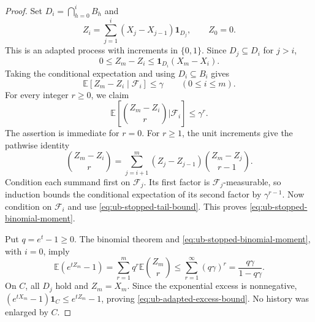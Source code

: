 \documentclass[11pt]{article}
\numberwithin{equation}{section}
\newcommand{\E}{\mathbb E}
\newcommand{\1}{\mathbf 1}
\begin{document}
\begin{proof}
Set $D_i=\bigcap_{h=0}^iB_h$ and
\[
 Z_i=\sum_{j=1}^i(X_j-X_{j-1})\1_{D_j},\qquad Z_0=0.
\]
This is an adapted process with increments in $\{0,1\}$. Since
$D_j\subseteq D_i$ for $j>i$,
\[
 0\le Z_m-Z_i\le\1_{D_i}(X_m-X_i).
\]
Taking the conditional expectation and using $D_i\subseteq B_i$ gives
\begin{equation}
\label{eq:ub-stopped-tail-bound}
 \E[Z_m-Z_i\mid\mathcal F_i]\le\gamma
 \qquad(0\le i\le m).
\end{equation}
For every integer $r\ge0$, we claim
\begin{equation}
\label{eq:ub-stopped-binomial-moment}
 \E\left[\binom{Z_m-Z_i}{r}\mathrel{\Big|}\mathcal F_i\right]
 \le\gamma^r.
\end{equation}
The assertion is immediate for $r=0$. For $r\ge1$, the unit increments
give the pathwise identity
\[
 \binom{Z_m-Z_i}{r}
 =\sum_{j=i+1}^m(Z_j-Z_{j-1})\binom{Z_m-Z_j}{r-1}.
\]
Condition each summand first on $\mathcal F_j$. Its first factor is
$\mathcal F_j$-measurable, so induction bounds the conditional
expectation of its second factor by $\gamma^{r-1}$. Now condition on
$\mathcal F_i$ and use \eqref{eq:ub-stopped-tail-bound}. This proves
\eqref{eq:ub-stopped-binomial-moment}.

Put $q=e^t-1\ge0$. The binomial theorem and
\eqref{eq:ub-stopped-binomial-moment}, with $i=0$, imply
\[
 \E(e^{tZ_m}-1)
 =\sum_{r=1}^m q^r\E\binom{Z_m}{r}
 \le\sum_{r=1}^{\infty}(q\gamma)^r
 =\frac{q\gamma}{1-q\gamma}.
\]
On $C$, all $D_j$ hold and $Z_m=X_m$. Since the exponential excess is
nonnegative, $(e^{tX_m}-1)\1_C\le e^{tZ_m}-1$, proving
\eqref{eq:ub-adapted-excess-bound}. No history was enlarged by $C$.
\end{proof}
\end{document}
